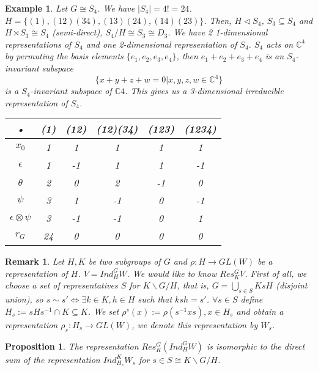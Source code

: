 \documentclass[letterpaper, leqno, 12pt]{article}
\newcommand{\fin}{\qquad \quad \hfill \framebox[1.75mm][l]{\,}}
\providecommand{\abs}[1]{\left\lvert#1\right\rvert}
\newcommand{\bC} {\mathbb{C}}
\theoremstyle{stdthm}
\newtheorem{prop}[thm]{Proposition}
\theoremstyle{stddef}
\newtheorem{rem}[thm]{Remark} %
\newtheorem{eg}[thm]{Example} %
\theoremstyle{stdnonum}
\theoremstyle{stdqands}
\theoremstyle{stdbold}
\begin{document}
\begin{eg}
Let $G \cong S_4$. We have $\abs{S_4} = 4! =24$. $H = \{(1),(12)(34),(13)(24),(14)(23)\}$. Then, $H \lhd S_4$, $S_3 \subseteq S_4$ and $H \rtimes S_3 \cong S_4$ (semi-direct), $S_4/H \cong S_3 \cong D_3 $. We have 2 1-dimensional representations of $S_4$ and one 2-dimensional representation of $S_4$. $S_4$ acts on $\bC^4$ by permuting the basis elements $\{e_1,e_2,e_3,e_4\}$, then $e_1 + e_2 + e_3 + e_4$ is an $S_4$- invariant subspace
\[ \{ x+y+z+w = 0 | x,y,z,w \in \bC^4\}\]
is a $S_4$-invariant subspace of $\bC4$. This gives us a 3-dimensional irreducible representation of $S_4$. \\

\begin{center}
\begin{tabular}{|c|c|c|c|c|c|}
\hline 
• & (1) & (12) & (12)(34) & (123) & (1234) \\ 
\hline 
$x_0$ & 1 & 1 & 1 & 1 & 1 \\ 
\hline 
$\epsilon$ & 1 & -1 & 1 & 1 & -1 \\ 
\hline 
$\theta$& 2 & 0 & 2 & -1 & 0 \\ 
\hline 
$\psi$ & 3 & 1 & -1 & 0 & -1 \\ 
\hline 
$\epsilon \otimes \psi$ & 3 & -1 & -1 & 0 & 1 \\ 
\hline 
$r_G$ & 24 & 0 & 0 & 0 & 0\\
\hline
\end{tabular}

\end{center} 
\end{eg}
\begin{rem}
Let $H,K$ be two subgroups of $G$ and $\rho: H \rightarrow GL(W)$ be a representation of $H$. $V = Ind_H^G W$. We would like to know $Res_K^G V$. First of all, we choose a set of representatives $S$ for $K \backslash G / H$, that is, $G = \bigcup_{s\in S} KsH$ (disjoint union), so $s \sim s' \Leftrightarrow \exists k \in K, h \in H $ such that $ksh = s'$. $\forall s\in S$ define $H_s := sHs^{-1} \cap K \subseteq K$. We set $\rho^s(x) := \rho(s^{-1} xs), x \in H_s$ and obtain a representation $\rho_s: H_s \rightarrow GL(W)$, we denote this representation by $W_s$. 
\end{rem}

\begin{prop}
The representation $Res_K^G(Ind_H^G W)$ is isomorphic to the direct sum of the representation $Ind_{H_s}^K W_s$ for $s \in S \cong K \backslash G / H$. 
\end{prop}
\end{document}
